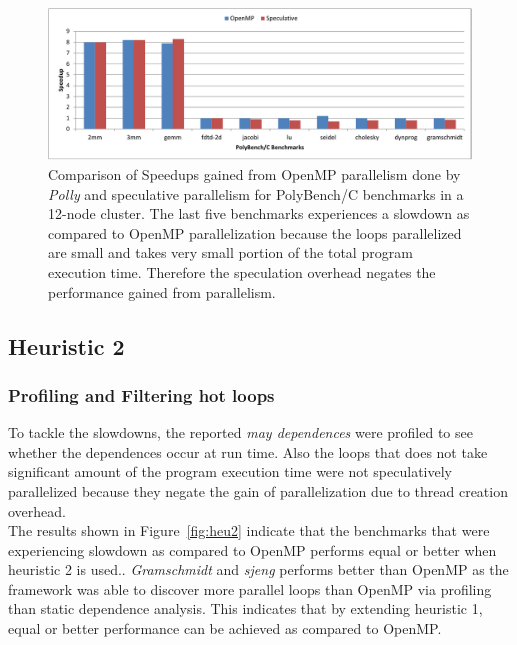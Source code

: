 \documentclass[10pt]{report}          %
\begin{document}
\begin{figure}[h]
\centering
\includegraphics[scale = 0.75]{./pdf/openmp_vs_spec_poly}
\caption{Comparison of Speedups gained from OpenMP parallelism done by \textit{Polly} and speculative parallelism for PolyBench/C benchmarks in a 12-node cluster. The last five benchmarks experiences a slowdown as compared to OpenMP parallelization because the loops parallelized are small and takes very small portion of the total program execution time.  Therefore the speculation overhead negates the performance gained from parallelism.}
\label{fig:openmp_vs_spec_poly}
\end{figure}

\subsection{Heuristic 2}

\subsubsection{Profiling and Filtering hot loops}

To tackle the slowdowns, the reported \textit{may dependences} were profiled to see whether the dependences occur at run time. Also the loops that does not take significant amount of the program execution time were not speculatively parallelized because they negate the gain of parallelization due to thread creation overhead. \\

The results shown in Figure~\ref{fig:heu2} indicate that the benchmarks that were experiencing slowdown as compared to OpenMP performs equal or better  when heuristic 2 is used..  \textit{Gramschmidt} and \textit{sjeng} performs better than OpenMP as the framework was able to discover more parallel loops than OpenMP via profiling than static dependence analysis.  This indicates that by extending heuristic 1, equal or better performance can be achieved as compared to OpenMP.
\end{document}
